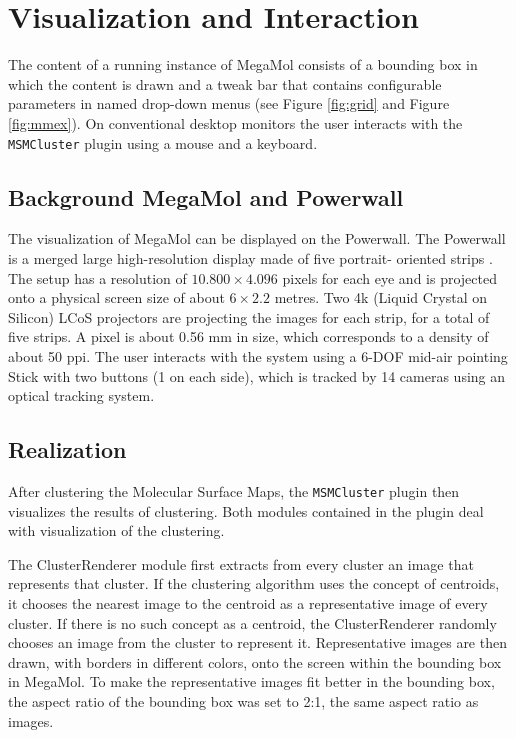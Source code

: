 \documentclass[journal]{vgtc}       %
\begin{document}
\section{Visualization and Interaction}\label{sec:viz}
The content of a running instance of MegaMol consists of a bounding box in which the content is drawn and a tweak bar that contains configurable parameters in  named drop-down menus (see Figure \ref{fig:grid} and Figure \ref{fig:mmex}). On conventional desktop monitors the user interacts with the \verb|MSMCluster| plugin using a mouse and  a keyboard.

\subsection{Background MegaMol and Powerwall}

The visualization of MegaMol can be displayed on the Powerwall.
The  Powerwall is a merged large high-resolution display made of five portrait- oriented
strips . The setup has  a resolution of $10.800 \times 4.096 $ pixels
for each eye  and is projected onto a physical screen size of about $6 \times 2.2$ metres. 
Two 4k (Liquid Crystal on Silicon) LCoS projectors are projecting the images for each strip, for a total of five strips.
A pixel is about 0.56 mm  in size, which corresponds to a density of about 50 ppi.
The user interacts with the system using a 6-DOF mid-air
pointing Stick with two buttons (1 on each side), which is tracked by 14 cameras
using an optical tracking system. 




\subsection{Realization}

After clustering the Molecular Surface Maps, the \verb|MSMCluster| plugin then visualizes the results of clustering. Both modules contained in the plugin deal with visualization of the clustering. 

The ClusterRenderer module first extracts from every cluster an image that represents that cluster. If the clustering algorithm uses the concept of centroids, it chooses the nearest image to the centroid as a representative image of every cluster. If there is no such concept as a centroid, the  ClusterRenderer randomly chooses an image from the cluster to represent it. Representative images are then drawn, with borders in different colors, onto the screen within the bounding box in MegaMol. To make the representative images fit better in the bounding box, the aspect ratio of the bounding box was set to 2:1, the same aspect ratio as images.
\end{document}
